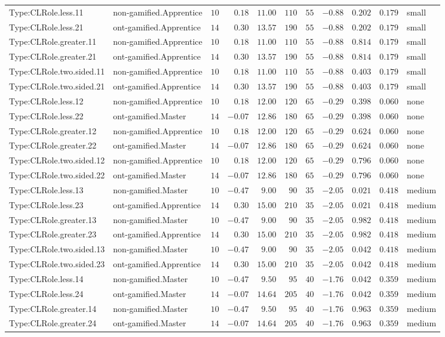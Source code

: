 \documentclass[6pt,a4paper]{article}
\begin{document}
{\begin{longtable}{llrrrrrrrrl}
Type:CLRole.less.11&non-gamified.Apprentice&$10$&$ 0.18$&$11.00$&$110$&$ 55$&$-0.88$&$0.202$&$0.179$&small\tabularnewline
Type:CLRole.less.21&ont-gamified.Apprentice&$14$&$ 0.30$&$13.57$&$190$&$ 55$&$-0.88$&$0.202$&$0.179$&small\tabularnewline
Type:CLRole.greater.11&non-gamified.Apprentice&$10$&$ 0.18$&$11.00$&$110$&$ 55$&$-0.88$&$0.814$&$0.179$&small\tabularnewline
Type:CLRole.greater.21&ont-gamified.Apprentice&$14$&$ 0.30$&$13.57$&$190$&$ 55$&$-0.88$&$0.814$&$0.179$&small\tabularnewline
Type:CLRole.two.sided.11&non-gamified.Apprentice&$10$&$ 0.18$&$11.00$&$110$&$ 55$&$-0.88$&$0.403$&$0.179$&small\tabularnewline
Type:CLRole.two.sided.21&ont-gamified.Apprentice&$14$&$ 0.30$&$13.57$&$190$&$ 55$&$-0.88$&$0.403$&$0.179$&small\tabularnewline
Type:CLRole.less.12&non-gamified.Apprentice&$10$&$ 0.18$&$12.00$&$120$&$ 65$&$-0.29$&$0.398$&$0.060$&none\tabularnewline
Type:CLRole.less.22&ont-gamified.Master&$14$&$-0.07$&$12.86$&$180$&$ 65$&$-0.29$&$0.398$&$0.060$&none\tabularnewline
Type:CLRole.greater.12&non-gamified.Apprentice&$10$&$ 0.18$&$12.00$&$120$&$ 65$&$-0.29$&$0.624$&$0.060$&none\tabularnewline
Type:CLRole.greater.22&ont-gamified.Master&$14$&$-0.07$&$12.86$&$180$&$ 65$&$-0.29$&$0.624$&$0.060$&none\tabularnewline
Type:CLRole.two.sided.12&non-gamified.Apprentice&$10$&$ 0.18$&$12.00$&$120$&$ 65$&$-0.29$&$0.796$&$0.060$&none\tabularnewline
Type:CLRole.two.sided.22&ont-gamified.Master&$14$&$-0.07$&$12.86$&$180$&$ 65$&$-0.29$&$0.796$&$0.060$&none\tabularnewline
Type:CLRole.less.13&non-gamified.Master&$10$&$-0.47$&$ 9.00$&$ 90$&$ 35$&$-2.05$&$0.021$&$0.418$&medium\tabularnewline
Type:CLRole.less.23&ont-gamified.Apprentice&$14$&$ 0.30$&$15.00$&$210$&$ 35$&$-2.05$&$0.021$&$0.418$&medium\tabularnewline
Type:CLRole.greater.13&non-gamified.Master&$10$&$-0.47$&$ 9.00$&$ 90$&$ 35$&$-2.05$&$0.982$&$0.418$&medium\tabularnewline
Type:CLRole.greater.23&ont-gamified.Apprentice&$14$&$ 0.30$&$15.00$&$210$&$ 35$&$-2.05$&$0.982$&$0.418$&medium\tabularnewline
Type:CLRole.two.sided.13&non-gamified.Master&$10$&$-0.47$&$ 9.00$&$ 90$&$ 35$&$-2.05$&$0.042$&$0.418$&medium\tabularnewline
Type:CLRole.two.sided.23&ont-gamified.Apprentice&$14$&$ 0.30$&$15.00$&$210$&$ 35$&$-2.05$&$0.042$&$0.418$&medium\tabularnewline
Type:CLRole.less.14&non-gamified.Master&$10$&$-0.47$&$ 9.50$&$ 95$&$ 40$&$-1.76$&$0.042$&$0.359$&medium\tabularnewline
Type:CLRole.less.24&ont-gamified.Master&$14$&$-0.07$&$14.64$&$205$&$ 40$&$-1.76$&$0.042$&$0.359$&medium\tabularnewline
Type:CLRole.greater.14&non-gamified.Master&$10$&$-0.47$&$ 9.50$&$ 95$&$ 40$&$-1.76$&$0.963$&$0.359$&medium\tabularnewline
Type:CLRole.greater.24&ont-gamified.Master&$14$&$-0.07$&$14.64$&$205$&$ 40$&$-1.76$&$0.963$&$0.359$&medium\tabularnewline

\end{longtable}}
\end{document}
